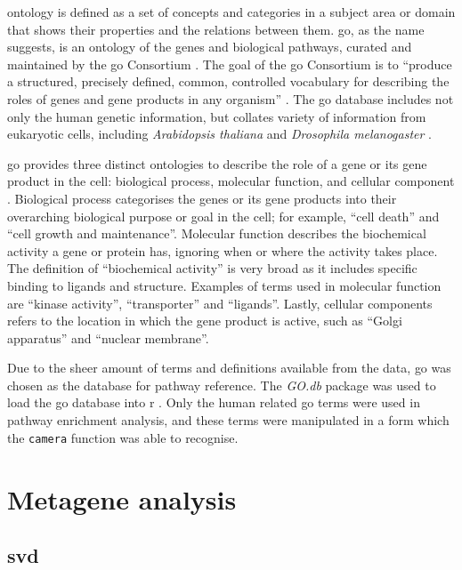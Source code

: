 \Gls{ontology} is defined as a set of concepts and categories in a subject area or domain that shows their properties and the relations between them.
\Acrfull{go}, as the name suggests, is an \gls{ontology} of the genes and biological pathways, curated and maintained by the \gls{go} Consortium \citep{GO2000,GO2004}.
The goal of the \gls{go} Consortium is to ``produce a structured, precisely defined, common, controlled vocabulary for describing the roles of genes and gene products in any organism'' \citep{GO2000}.
The \gls{go} database includes not only the human genetic information, but collates variety of information from eukaryotic cells, including \textit{Arabidopsis thaliana} and \textit{Drosophila melanogaster} \citep{GO2000,GO2004}.

\gls{go} provides three distinct ontologies to describe the role of a gene or its gene product in the cell: biological process, molecular function, and cellular component \citep{GO2000}.
Biological process categorises the genes or its gene products into their overarching biological purpose or goal in the cell; for example, ``cell death'' and ``cell growth and maintenance''.
Molecular function describes the biochemical activity a gene or protein has, ignoring when or where the activity takes place.
The definition of ``biochemical activity'' is very broad as it includes specific binding to ligands and structure.
Examples of terms used in molecular function are ``kinase activity'', ``transporter'' and ``ligands''.
Lastly, cellular components refers to the location in which the gene product is active, such as ``Golgi apparatus'' and ``nuclear membrane''.

Due to the sheer amount of terms and definitions available from the data, \gls{go} was chosen as the database for pathway reference.
The \textit{GO.db} package was used to load the \gls{go} database into \gls{r} \citep{Carlson2016}.
Only the human related \gls{go} terms were used in pathway enrichment analysis, and these terms were manipulated in a form which the \texttt{camera} function was able to recognise.

\section{Metagene analysis}
\label{sec:metagene_analysis}

\subsection{\Gls{svd}}
\label{sub:svd}

